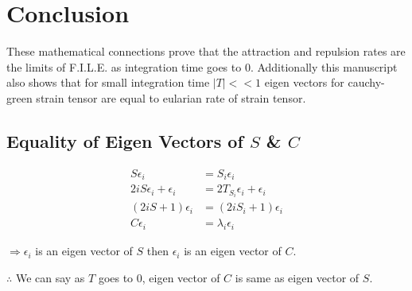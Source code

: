 \documentclass[../report.tex]{subfiles}
\begin{document}
\chapter{Conclusion}

These mathematical connections prove that the attraction and repulsion rates are the limits of F.I.L.E. as integration time goes to 0. Additionally this manuscript also shows that for small integration time \(|T| << 1\) eigen vectors for cauchy-green strain tensor are equal to eularian rate of strain tensor.

\section{Equality of Eigen Vectors of \(S\) \& \(C\)}
\begin{equation}
  \begin{aligned}
    S\epsilon_i &= S_i\epsilon_i \\
    2iS\epsilon_i + \epsilon_i &= 2T_{S_i}\epsilon_i + \epsilon_i \\
    (2iS + 1)\epsilon_i &= (2iS_i + 1)\epsilon_i \\
    C\epsilon_i &= \lambda_i\epsilon_i
  \end{aligned}
\end{equation}

\(\Rightarrow \epsilon_i\) is an eigen vector of \(S\) then \(\epsilon_i\) is an eigen vector of \(C\).

\(\therefore\) We can say as \(T\) goes to 0, eigen vector of \(C\) is same as eigen vector of \(S\).
\end{document}
